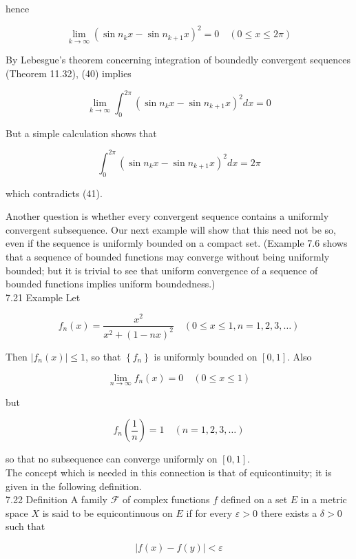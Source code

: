 \documentclass[10pt]{article}
\begin{document}
hence


\begin{equation*}
\lim _{k \rightarrow \infty}\left(\sin n_{k} x-\sin n_{k+1} x\right)^{2}=0 \quad(0 \leq x \leq 2 \pi) \tag{40}
\end{equation*}


By Lebesgue's theorem concerning integration of boundedly convergent sequences (Theorem 11.32), (40) implies


\begin{equation*}
\lim _{k \rightarrow \infty} \int_{0}^{2 \pi}\left(\sin n_{k} x-\sin n_{k+1} x\right)^{2} d x=0 \tag{41}
\end{equation*}


But a simple calculation shows that

$$
\int_{0}^{2 \pi}\left(\sin n_{k} x-\sin n_{k+1} x\right)^{2} d x=2 \pi
$$

which contradicts (41).

Another question is whether every convergent sequence contains a uniformly convergent subsequence. Our next example will show that this need not be so, even if the sequence is uniformly bounded on a compact set. (Example 7.6 shows that a sequence of bounded functions may converge without being uniformly bounded; but it is trivial to see that uniform convergence of a sequence of bounded functions implies uniform boundedness.)\\
7.21 Example Let

$$
f_{n}(x)=\frac{x^{2}}{x^{2}+(1-n x)^{2}} \quad(0 \leq x \leq 1, n=1,2,3, \ldots)
$$

Then $\left|f_{n}(x)\right| \leq 1$, so that $\left\{f_{n}\right\}$ is uniformly bounded on $[0,1]$. Also

$$
\lim _{n \rightarrow \infty} f_{n}(x)=0 \quad(0 \leq x \leq 1)
$$

but

$$
f_{n}\left(\frac{1}{n}\right)=1 \quad(n=1,2,3, \ldots)
$$

so that no subsequence can converge uniformly on $[0,1]$.\\
The concept which is needed in this connection is that of equicontinuity; it is given in the following definition.\\
7.22 Definition A family $\mathscr{F}$ of complex functions $f$ defined on a set $E$ in a metric space $X$ is said to be equicontinuous on $E$ if for every $\varepsilon>0$ there exists a $\delta>0$ such that

$$
|f(x)-f(y)|<\varepsilon
$$
\end{document}
